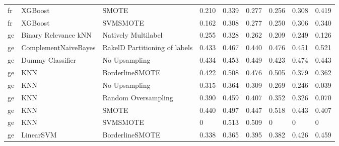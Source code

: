 \begin{tabular}{lllllllll}
      fr &                         XGBoost &                         SMOTE & 0.210 &                     0.339 &                 0.277 &                  0.256 &                                   0.308 &     0.419 \\
      fr &                         XGBoost &                      SVMSMOTE & 0.162 &                     0.308 &                 0.277 &                  0.250 &                                   0.306 &     0.340 \\
      ge &            Binary Relevance kNN &           Natively Multilabel & 0.255 &                     0.328 &                 0.262 &                  0.209 &                                   0.249 &     0.126 \\
      ge &            ComplementNaiveBayes & RakelD Partitioning of labels & 0.433 &                     0.467 &                 0.440 &                  0.476 &                                   0.451 &     0.521 \\
      ge &                Dummy Classifier &                 No Upsampling & 0.434 &                     0.453 &                 0.449 &                  0.423 &                                   0.474 &     0.443 \\
      ge &                             KNN &               BorderlineSMOTE & 0.422 &                     0.508 &                 0.476 &                  0.505 &                                   0.379 &     0.362 \\
      ge &                             KNN &                 No Upsampling & 0.315 &                     0.364 &                 0.309 &                  0.269 &                                   0.246 &     0.039 \\
      ge &                             KNN &           Random Oversampling & 0.390 &                     0.459 &                 0.407 &                  0.352 &                                   0.326 &     0.070 \\
      ge &                             KNN &                         SMOTE & 0.440 &                     0.497 &                 0.447 &                  0.518 &                                   0.443 &     0.407 \\
      ge &                             KNN &                      SVMSMOTE &     0 &                     0.513 &                 0.509 &                      0 &                                       0 &         0 \\
      ge &                       LinearSVM &               BorderlineSMOTE & 0.338 &                     0.365 &                 0.395 &                  0.382 &                                   0.426 &     0.459 \\

\end{tabular}
